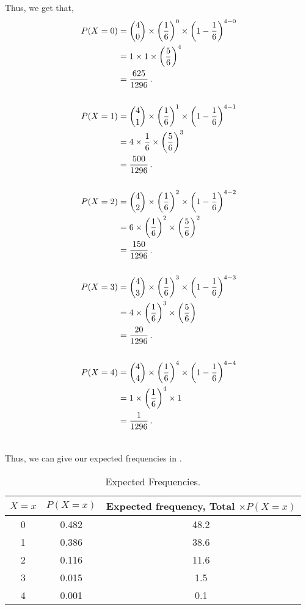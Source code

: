 \begin{subquestions}
Thus, we get that,
\begin{align}
	P(X=0) & = { 4 \choose 0} \times \left(\frac{1}{6} \right)^0 \times \left(1-\frac{1}{6} \right)^{4-0} \nonumber \\
	       & = 1 \times 1 \times \left(\frac{5}{6} \right)^{4} \nonumber \\
	       & = \frac{625}{1296} \,. \\ \nonumber \\
	P(X=1) & = { 4 \choose 1} \times \left(\frac{1}{6} \right)^1 \times \left(1-\frac{1}{6} \right)^{4-1} \nonumber \\
		   & = 4 \times \frac{1}{6} \times \left(\frac{5}{6} \right)^{3} \nonumber \\
		   & = \frac{500}{1296} \,. \\ \nonumber \\
	P(X=2) & = { 4 \choose 2} \times \left(\frac{1}{6} \right)^2 \times \left(1-\frac{1}{6} \right)^{4-2} \nonumber \\
		   & = 6 \times \left(\frac{1}{6}\right)^2 \times \left(\frac{5}{6} \right)^{2} \nonumber \\
		   & = \frac{150}{1296} \,. \\ \nonumber \\
	P(X=3) & = { 4 \choose 3} \times \left(\frac{1}{6} \right)^3 \times \left(1-\frac{1}{6} \right)^{4-3} \nonumber \\
		   & = 4 \times \left(\frac{1}{6}\right)^3 \times \left(\frac{5}{6} \right) \nonumber \\
      	   & = \frac{20}{1296} \,. \\ \nonumber \\
    P(X=4) & = { 4 \choose 4} \times \left(\frac{1}{6} \right)^4 \times \left(1-\frac{1}{6} \right)^{4-4} \nonumber \\
    	   & = 1 \times \left(\frac{1}{6}\right)^4 \times 1 \nonumber \\
    	   & = \frac{1}{1296} \,. \\ \nonumber \\
\end{align}

Thus, we can give our expected frequencies in .
	
\begin{table}[H]
	\centering
	\begin{tabular}{|c|c|c|}
		\hline
		$X=x$ & $P(X=x)$ & Expected frequency, Total $\times P(X=x)$ \\
		\hline
		0 & 0.482 & 48.2 \\
		1 & 0.386 & 38.6 \\
		2 & 0.116 & 11.6 \\
		3 & 0.015 & 1.5 \\
		4 & 0.001 & 0.1 \\
		\hline
	\end{tabular}
	\caption{\label{2008M:q3:Bin1} Expected Frequencies.}
\end{table}


\end{subquestions}
